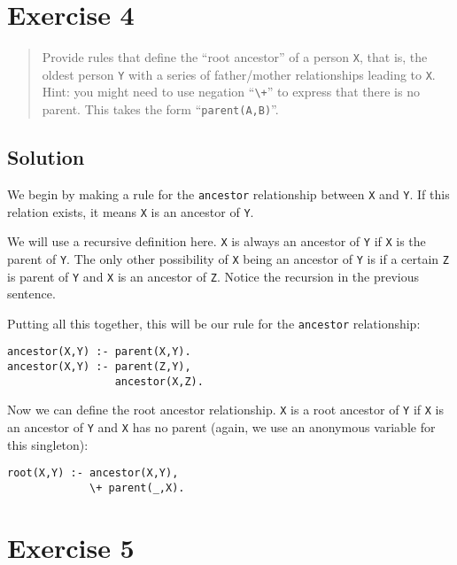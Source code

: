 \documentclass[11pt]{article}
\begin{document}
\newpage

\section{Exercise 4}

\begin{quote}
Provide rules that define the ``root ancestor'' of a person \verb|X|, that is, the oldest person \verb|Y| with a series of father/mother relationships leading to \verb|X|. Hint: you might need to use negation ``\verb|\+|'' to express that there is no parent. This takes the form ``\verb|parent(A,B)|''.
\end{quote}

\subsection*{Solution}

We begin by making a rule for the \verb|ancestor| relationship between \verb|X| and \verb|Y|. If this relation exists, it means \verb|X| is an ancestor of \verb|Y|.

We will use a recursive definition here. \verb|X| is always an ancestor of \verb|Y| if \verb|X| is the parent of \verb|Y|. The only other possibility of \verb|X| being an ancestor of \verb|Y| is if a certain \verb|Z| is parent of \verb|Y| and \verb|X| is an ancestor of \verb|Z|. Notice the recursion in the previous sentence.

Putting all this together, this will be our rule for the \verb|ancestor| relationship:

\begin{verbatim}
ancestor(X,Y) :- parent(X,Y).
ancestor(X,Y) :- parent(Z,Y),
                 ancestor(X,Z).
\end{verbatim}

Now we can define the root ancestor relationship. \verb|X| is a root ancestor of \verb|Y| if \verb|X| is an ancestor of \verb|Y| and \verb|X| has no parent (again, we use an anonymous variable for this singleton):

\begin{verbatim}
root(X,Y) :- ancestor(X,Y),
             \+ parent(_,X).
\end{verbatim}


\newpage

\section{Exercise 5}
\end{document}
